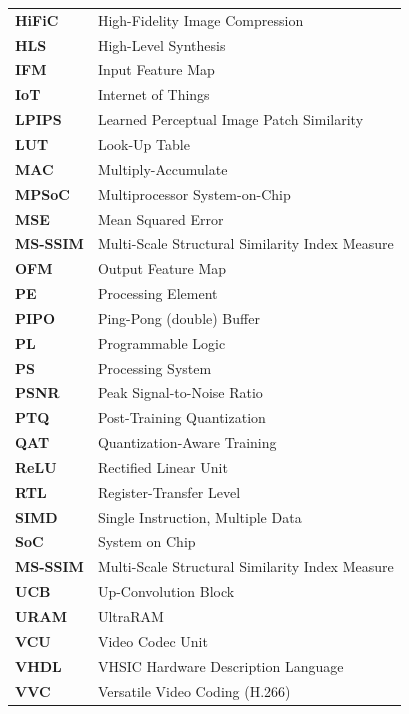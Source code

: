 {\begin{longtable}{>{\raggedright\arraybackslash}p{} >{\raggedright\arraybackslash}p{}}
\textbf{HiFiC} & High-Fidelity Image Compression \\
\textbf{HLS} & High-Level Synthesis \\
\textbf{IFM} & Input Feature Map \\
\textbf{IoT} & Internet of Things \\
\textbf{LPIPS} & Learned Perceptual Image Patch Similarity \\
\textbf{LUT} & Look-Up Table \\
\textbf{MAC} & Multiply-Accumulate \\
\textbf{MPSoC} & Multiprocessor System-on-Chip \\
\textbf{MSE} & Mean Squared Error \\
\textbf{MS-SSIM} & Multi-Scale Structural Similarity Index Measure \\
\textbf{OFM} & Output Feature Map \\
\textbf{PE} & Processing Element \\
\textbf{PIPO} & Ping-Pong (double) Buffer \\
\textbf{PL} & Programmable Logic \\
\textbf{PS} & Processing System \\
\textbf{PSNR} & Peak Signal-to-Noise Ratio \\
\textbf{PTQ} & Post-Training Quantization \\
\textbf{QAT} & Quantization-Aware Training \\
\textbf{ReLU} & Rectified Linear Unit \\
\textbf{RTL} & Register-Transfer Level \\
\textbf{SIMD} & Single Instruction, Multiple Data \\
\textbf{SoC} & System on Chip \\
\textbf{MS-SSIM} & Multi-Scale Structural Similarity Index Measure \\
\textbf{UCB} & Up-Convolution Block \\
\textbf{URAM} & UltraRAM \\
\textbf{VCU} & Video Codec Unit \\
\textbf{VHDL} & VHSIC Hardware Description Language \\
\textbf{VVC} & Versatile Video Coding (H.266) \\
\end{longtable}
}

\cleardoublepage